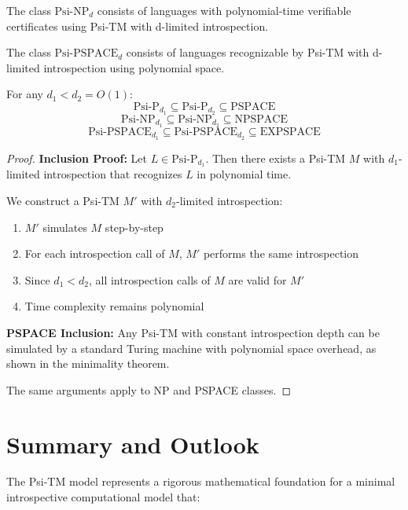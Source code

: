   \begin{definition}
  The class $\text{Psi-NP}_d$ consists of languages with polynomial-time verifiable certificates using Psi-TM with d-limited introspection.
  \end{definition}
  
  \begin{definition}
  The class $\text{Psi-PSPACE}_d$ consists of languages recognizable by Psi-TM with d-limited introspection using polynomial space.
  \end{definition}
  
  \begin{theorem}
  For any $d_1 < d_2 = O(1)$:
  $$\text{Psi-P}_{d_1} \subseteq \text{Psi-P}_{d_2} \subseteq \text{PSPACE}$$
  $$\text{Psi-NP}_{d_1} \subseteq \text{Psi-NP}_{d_2} \subseteq \text{NPSPACE}$$
  $$\text{Psi-PSPACE}_{d_1} \subseteq \text{Psi-PSPACE}_{d_2} \subseteq \text{EXPSPACE}$$
  \end{theorem}
  
  \begin{proof}
  \textbf{Inclusion Proof:}
  Let $L \in \text{Psi-P}_{d_1}$. Then there exists a Psi-TM $M$ with $d_1$-limited introspection that recognizes $L$ in polynomial time.
  
  We construct a Psi-TM $M'$ with $d_2$-limited introspection:
  \begin{enumerate}
  \item $M'$ simulates $M$ step-by-step
  \item For each introspection call of $M$, $M'$ performs the same introspection
  \item Since $d_1 < d_2$, all introspection calls of $M$ are valid for $M'$
  \item Time complexity remains polynomial
  \end{enumerate}
  
  \textbf{PSPACE Inclusion:}
  Any Psi-TM with constant introspection depth can be simulated by a standard Turing machine with polynomial space overhead, as shown in the minimality theorem.
  
  The same arguments apply to NP and PSPACE classes.
  \end{proof}
  
  \section{Summary and Outlook}
  
  The Psi-TM model represents a rigorous mathematical foundation for a minimal introspective computational model that:
  
